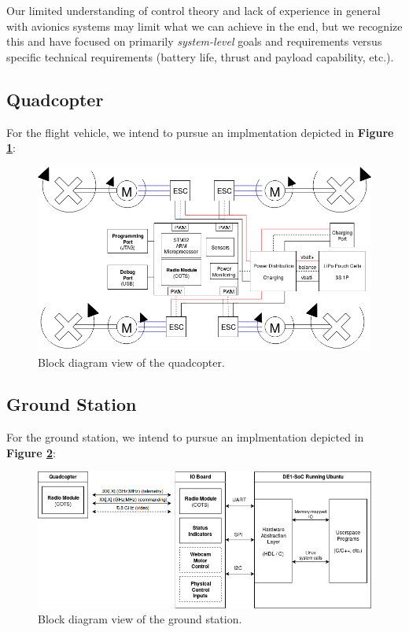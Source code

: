 \documentclass{article}
\begin{document}
\noindent Our limited understanding of control theory and lack of experience in
general with avionics systems may limit what we can achieve in the end, but we
recognize this and have focused on primarily \textit{system-level} goals and
requirements versus specific technical requirements (battery life, thrust and
payload capability, etc.).

\subsection{Quadcopter}

For the flight vehicle, we intend to pursue an implmentation depicted in
\textbf{Figure \ref{fig:quadcopter}}:

\begin{figure}[H]
	\centering
	\includegraphics[width=\linewidth]{../src/im/quadcopter}
	\caption{Block diagram view of the quadcopter.}
	\label{fig:quadcopter}
\end{figure}


\pagebreak

\subsection{Ground Station}

For the ground station, we intend to pursue an implmentation depicted in
\textbf{Figure \ref{fig:ground_station}}:

\begin{figure}[H]
	\centering
	\includegraphics[width=\linewidth]{../src/im/ground_station}
	\caption{Block diagram view of the ground station.}
	\label{fig:ground_station}
\end{figure}
\end{document}
